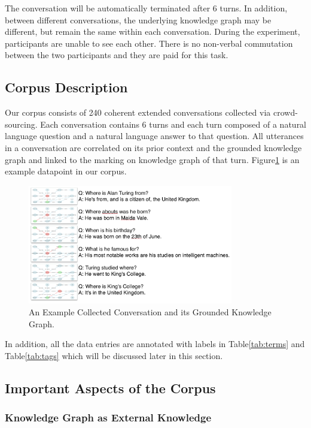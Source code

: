 \documentclass[bsc,frontabs,twoside,singlespacing,parskip,deptreport]{infthesis}     %
\begin{document}
The conversation will be automatically terminated after 6 turns. In addition, between different conversations, the underlying knowledge graph may be different, but remain the same within each conversation. During the experiment, participants are unable to see each other. There is no non-verbal commutation between the two participants and they are paid for this task.

\subsection{Corpus Description}

Our corpus consists of 240 coherent extended conversations collected via crowd-sourcing. Each conversation contains 6 turns and each turn composed of a natural language question and a natural language answer to that question. All utterances in a conversation are correlated on its prior context and the grounded knowledge graph and linked to the marking on knowledge graph of that turn. Figure\ref{fig:exampledata} is an example datapoint in our corpus.

\begin{figure}[h]
    \centering
    \includegraphics[width=0.8\textwidth]{eaxmppledata.png}
    \caption{An Example Collected Conversation and its Grounded Knowledge Graph.}
    \label{fig:exampledata}
\end{figure}

In addition, all the data entries are annotated with labels in Table\ref{tab:terms} and Table\ref{tab:tags} which will be discussed later in this section.



\subsection{Important Aspects of the Corpus}

\subsubsection*{Knowledge Graph as External Knowledge}
\end{document}
